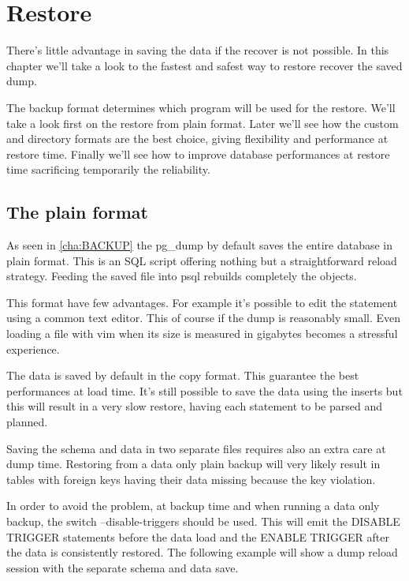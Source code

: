 \chapter{Restore}
\label{cha:RESTORE}
There's little advantage in saving the data if the recover is not possible. 
In this chapter we'll take a look to the fastest and safest way to restore recover the saved 
dump.\newline

The backup format determines which program will be used for the restore. 
We'll take a look first on the restore from plain format. Later we'll see how the custom and 
directory formats are the best choice, giving flexibility and performance at restore time. Finally 
we'll see how to improve database performances at restore time sacrificing temporarily the 
reliability.

\section{The plain format}
\label{sec:PLAINFORMAT}
As seen in \ref{cha:BACKUP} the pg\_dump by default saves the entire database in plain format. This 
is an SQL script offering nothing but a straightforward reload strategy. Feeding the saved file 
into psql rebuilds completely the objects.\newline

This format have few advantages. For example it's possible to edit the statement using a common 
text editor. This of course if the dump is reasonably small. Even loading a file with vim when 
its size is measured in gigabytes becomes a stressful experience.\newline

The data is saved by default in the copy format. This guarantee the best performances at load time. 
It's still possible to save the data using the inserts but this will result in a very slow restore, 
having each statement to be parsed and planned.\newline

Saving the schema and data in two separate files requires also an extra care at dump time. 
Restoring from a data only plain backup will very likely result in tables with foreign keys 
having their data missing because the key violation. \newline

In order to avoid the problem, at backup time and  when running a data only backup, the switch 
--disable-triggers should be used. This will emit the DISABLE TRIGGER statements before the data 
load and the ENABLE TRIGGER after the data is consistently restored. The following example will 
show a dump reload session with the separate schema and data save.

